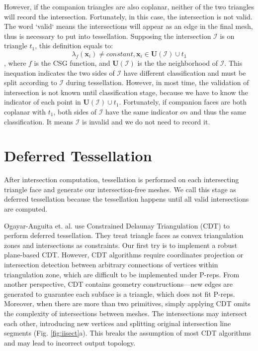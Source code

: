 \documentclass[10pt,journal,compsoc]{IEEEtran}
\begin{document}
However, if the companion triangles are also coplanar, neither of the two triangles will record the intersection. Fortunately, in this case, the intersection is not valid. The word `valid` means the intersections will appear as an edge in the final mesh, thus is necessary to put into tessellation. Supposing the intersection $\mathcal{I}$  is on triangle $t_1$, this definition equals to:
\begin{equation}
\lambda_f(\bm{x}_i) \neq constant, \bm{x}_i \in \bm{U}(\mathcal{I}) \cup t_1
\end{equation}
, where $f$ is the CSG function, and $\bm{U}(\mathcal{I})$ is the the neighborhood of $\mathcal{I}$. This inequation indicates the two sides of $\mathcal{I}$ have different classification and must be split according to $\mathcal{I}$ during tessellation. However, in most time, the validation of intersection is not known until classification stage, because we have to know the indicator of each point in $\bm{U}(\mathcal{I}) \cup t_1$. Fortunately, if companion faces are both coplanar with $t_1$, both sides of $\mathcal{I}$ have the same indicator $on$ and thus the same classification. It means $\mathcal{I}$ is invalid and we do not need to record it.

\section{Deferred Tessellation}



\label{sec:tessellation}
After intersection computation, tessellation is performed on each intersecting triangle face and generate our intersection-free meshes. We call this stage as deferred tessellation because the tessellation happens until all valid intersections are computed.

Ogayar-Anguita et. al. \cite{ogayar2015deferred} use Constrained Delaunay Triangulation (CDT) to perform deferred tessellation. They treat triangle faces as convex triangulation zones and intersections as constraints. Our first try is to implement a robust plane-based CDT. However, CDT algorithms \cite{chew1989constrained,preparata2012computational} require coordinates projection or intersection detection between arbitrary connections of vertices within triangulation zone, which are difficult to be implemented under P-reps. From another perspective, CDT contains geometry constructions---new edges are generated to guarantee each subface is a triangle, which does not fit P-reps. Moreover, when there are more than two primitives, simply applying CDT omits the complexity of intersections between meshes. The intersections may intersect each other, introducing new vertices and splitting original intersection line segments (Fig. \ref{fig:iisect}a). This breaks the assumption of most CDT algorithms and may lead to incorrect output topology.
\end{document}
